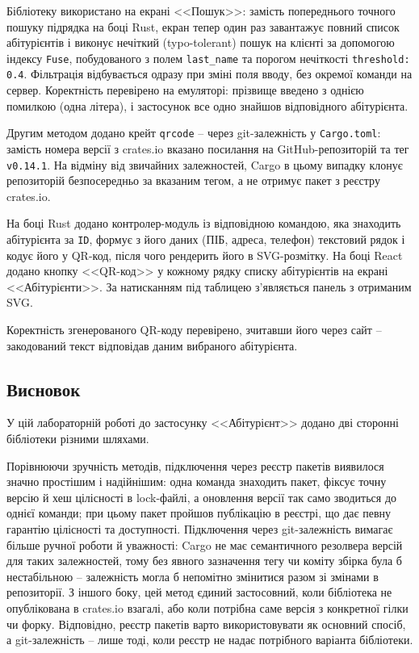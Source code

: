 \documentclass[14pt, a4paper]{extreport}
\begin{document}
	
	Бібліотеку використано на екрані <<Пошук>>: замість попереднього точного пошуку підрядка на боці Rust, екран тепер один раз завантажує повний список абітурієнтів і виконує нечіткий (typo-tolerant) пошук на клієнті за допомогою індексу \texttt{Fuse}, побудованого з полем \texttt{last\_name} та порогом нечіткості \texttt{threshold: 0.4}. Фільтрація відбувається одразу при зміні поля вводу, без окремої команди на сервер. Коректність перевірено на емуляторі: прізвище введено з однією помилкою (одна літера), і застосунок все одно знайшов відповідного абітурієнта.
	
	
	Другим методом додано крейт \texttt{qrcode} -- через git-залежність у \texttt{Cargo.toml}: замість номера версії з crates.io вказано посилання на GitHub-репозиторій та тег \texttt{v0.14.1}. На відміну від звичайних залежностей, Cargo в цьому випадку клонує репозиторій безпосередньо за вказаним тегом, а не отримує пакет з реєстру crates.io.
	
	
	На боці Rust додано контролер-модуль із відповідною командою, яка знаходить абітурієнта за \texttt{ID}, формує з його даних (ПІБ, адреса, телефон) текстовий рядок і кодує його у QR-код, після чого рендерить його в SVG-розмітку. На боці React додано кнопку <<QR-код>> у кожному рядку списку абітурієнтів на екрані <<Абітурієнти>>. За натисканням під таблицею з'являється панель з отриманим SVG.
	
	
	Коректність згенерованого QR-коду перевірено, зчитавши його через сайт -- закодований текст відповідав даним вибраного абітурієнта.
	

	\subsection*{Висновок}

	У цій лабораторній роботі до застосунку <<Абітурієнт>> додано дві сторонні бібліотеки різними шляхами. 
	
	Порівнюючи зручність методів, підключення через реєстр пакетів виявилося значно простішим і надійнішим: одна команда знаходить пакет, фіксує точну версію й хеш цілісності в lock-файлі, а оновлення версії так само зводиться до однієї команди; при цьому пакет пройшов публікацію в реєстрі, що дає певну гарантію цілісності та доступності. Підключення через git-залежність вимагає більше ручної роботи й уважності: Cargo не має семантичного резолвера версій для таких залежностей, тому без явного зазначення тегу чи коміту збірка була б нестабільною -- залежність могла б непомітно змінитися разом зі змінами в репозиторії. З іншого боку, цей метод єдиний застосовний, коли бібліотека не опублікована в crates.io взагалі, або коли потрібна саме версія з конкретної гілки чи форку. Відповідно, реєстр пакетів варто використовувати як основний спосіб, а git-залежність -- лише тоді, коли реєстр не надає потрібного варіанта бібліотеки.
	
\end{document}
